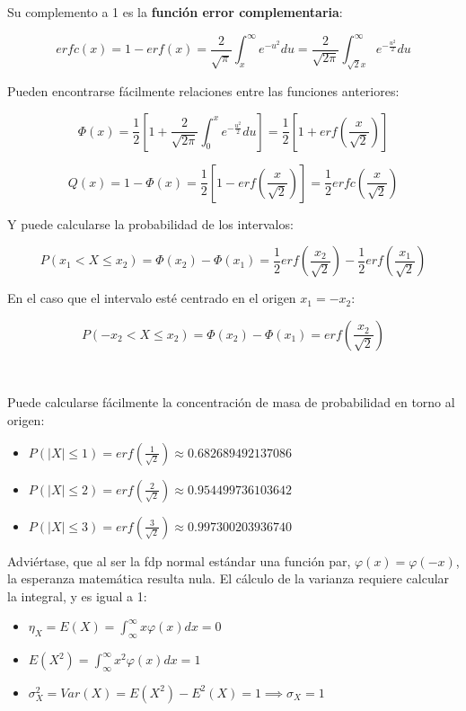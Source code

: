 \documentclass[11pt]{article}
\providecommand{\tightlist}{%
      \setlength{\itemsep}{0pt}\setlength{\parskip}{0pt}}
\begin{document}
Su complemento a 1 es la \textbf{función error complementaria}:

\[erfc(x) = 1-erf(x) = \frac{2}{\sqrt{\pi}}\int_x^\infty e^{-u^2} du = \frac{2}{\sqrt{2\pi}}\int_{\sqrt{2}x}^\infty e^{-\frac{u^2}{2}}du\]

    Pueden encontrarse fácilmente relaciones entre las funciones anteriores:

\[\Phi(x) = \frac{1}{2}\left[1 + \frac{2}{\sqrt{2\pi}} \int_{0}^x  e^{-\frac{u^2}{2}}du \right] = \frac{1}{2}\left[1 + erf(\frac{x}{\sqrt{2}}) \right]\]

\[Q(x) = 1 - \Phi(x) = \frac{1}{2}\left[1 - erf(\frac{x}{\sqrt{2}}) \right] = \frac{1}{2}erfc(\frac{x}{\sqrt{2}})\]

Y puede calcularse la probabilidad de los intervalos:

\[P(x_1<X\leq x_2) = \Phi(x_2)-\Phi(x_1) = \frac{1}{2}erf(\frac{x_2}{\sqrt{2}}) - \frac{1}{2}erf(\frac{x_1}{\sqrt{2}})\]

En el caso que el intervalo esté centrado en el origen \(x_1 = -x_2\):

\[P(-x_2<X\leq x_2) = \Phi(x_2)-\Phi(x_1) = erf(\frac{x_2}{\sqrt{2}})\]

    \begin{center}
    \end{center}
    { \hspace*{\fill} \\}
    
    Puede calcularse fácilmente la concentración de masa de probabilidad en
torno al origen:

\begin{itemize}
\tightlist
\item
  \(P(|X|\leq 1) = erf(\frac{1}{\sqrt2}) \approx 0.682689492137086\)
\item
  \(P(|X|\leq 2) = erf(\frac{2}{\sqrt2}) \approx 0.954499736103642\)
\item
  \(P(|X|\leq 3) = erf(\frac{3}{\sqrt2}) \approx 0.997300203936740\)
\end{itemize}

Adviértase, que al ser la fdp normal estándar una función par,
\(\varphi(x) = \varphi(-x)\), la esperanza matemática resulta nula. El
cálculo de la varianza requiere calcular la integral, y es igual a 1:

\begin{itemize}
\tightlist
\item
  \(\eta_X=E(X) = \int_\infty^\infty x\varphi(x) dx = 0\)
\item
  \(E(X^2) = \int_\infty^\infty x^2\varphi(x) dx = 1\)
\item
  \(\sigma_X^2=Var(X) = E(X^2) - E^2(X) = 1 \implies \sigma_X = 1\)
\end{itemize}
\end{document}
